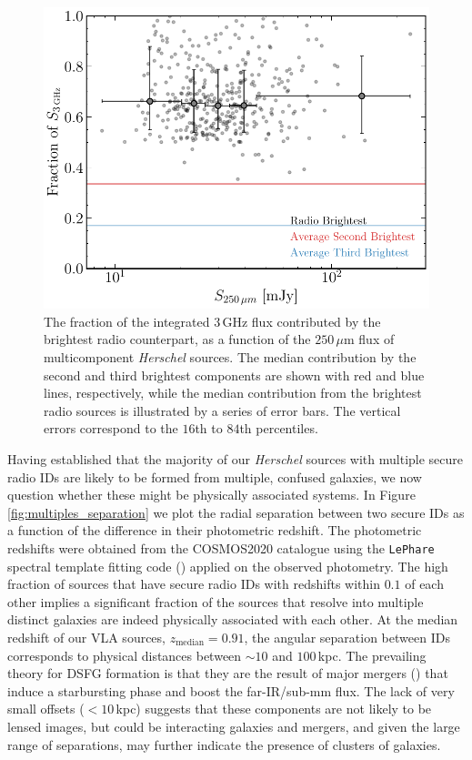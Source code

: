 \begin{figure}
	\centering
	\includegraphics[width=0.8\columnwidth]{Figures/multiples_flux_contribution.pdf}
	\caption[Contribution to total radio flux from multicomponent radio sources]{The fraction of the integrated $3\,$GHz flux contributed by the brightest radio counterpart, as a function of the $250\,\mu$m flux of multicomponent \textit{Herschel} sources. The median contribution by the second and third brightest components are shown with red and blue lines, respectively, while the median contribution from the brightest radio sources is illustrated by a series of error bars. The vertical errors correspond to the $16$th to $84$th percentiles.}
	\label{fig:multiples_flux_contribution}
\end{figure}

Having established that the majority of our \textit{Herschel} sources with multiple secure radio IDs are likely to be formed from multiple, confused galaxies, we now question whether these might be physically associated systems. In Figure \ref{fig:multiples_separation} we plot the radial separation between two secure IDs as a function of the difference in their photometric redshift. The photometric redshifts were obtained from the COSMOS2020 catalogue using the \texttt{LePhare} spectral template fitting code (\citealt{Arnouts_1999, Ilbert_2006}) applied on the observed photometry. The high fraction of sources that have secure radio IDs with redshifts within $0.1$ of each other implies a significant fraction of the sources that resolve into multiple distinct galaxies are indeed physically associated with each other. At the median redshift of our VLA sources, $z_\textrm{median} = 0.91$, the angular separation between IDs corresponds to physical distances between $\sim 10$ and $100\,$kpc. The prevailing theory for DSFG formation is that they are the result of major mergers (\citealt{Ivison_2002, Smail_2004, Ivison_2007, Engel_2010, Hayward_2011}) that induce a starbursting phase and boost the far-IR/sub-mm flux. The lack of very small offsets ($< 10\,$kpc) suggests that these components are not likely to be lensed images, but could be interacting galaxies and mergers, and given the large range of separations, may further indicate the presence of clusters of galaxies.

